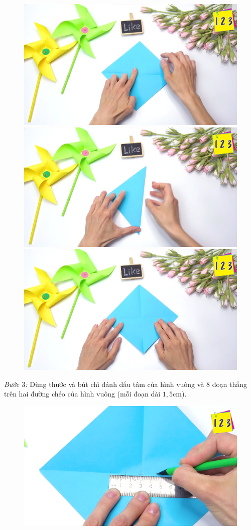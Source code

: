 \begin{multicols}{2}
\begin{figure}[H]
		\centering
		\captionsetup{labelformat= empty, justification=centering}
		\includegraphics[width= 0.7\linewidth]{2b}
		\includegraphics[width= 0.7\linewidth]{2c}
		\includegraphics[width= 0.7\linewidth]{2d}
		\vspace*{-10pt}
	\end{figure}
	\textit{Bước $3$:} Dùng thước và bút chì đánh dấu tâm của hình vuông và $8$ đoạn thẳng trên hai đường chéo của hình vuông (mỗi đoạn dài $1,5$cm).
	\begin{figure}[H]
		\vspace*{-5pt}
		\centering
		\captionsetup{labelformat= empty, justification=centering}
		\includegraphics[width= 0.7\linewidth]{3a}

\end{figure}
\end{multicols}
